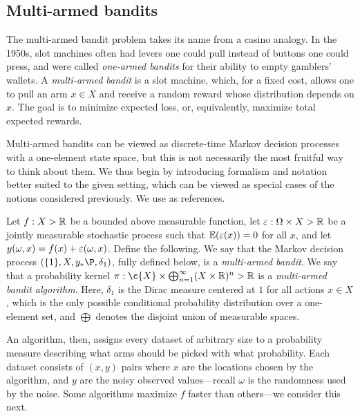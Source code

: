 \documentclass[11pt]{book}
\begin{document}
\subsection{Multi-armed bandits}

The multi-armed bandit problem takes its name from a casino analogy.
In the 1950s, slot machines often had levers one could pull instead of buttons one could press, and were called \emph{one-armed bandits} for their ability to empty gamblers' wallets.
A \emph{multi-armed bandit} is a slot machine, which, for a fixed cost, allows one to pull an arm $x \in X$ and receive a random reward whose distribution depends on $x$.
The goal is to minimize  expected loss, or, equivalently, maximize total expected rewards.

Multi-armed bandits can be viewed as discrete-time Markov decision processes with a one-element state space, but this is not necessarily the most fruitful way to think about them.
We thus begin by introducing formalism and notation better suited to the given setting, which can be viewed as special cases of the notions considered previously.
We use \textcite{slivkins19,lattimore20} as references.

\label{ntn:mab}
\begin{definition}
Let $f : X \-> \mathbb{R}$ be a bounded above measurable function, let $\varepsilon : \Omega \times X \-> \mathbb{R}$ be a jointly measurable stochastic process such that $\operatorname{\mathbb{E}}(\varepsilon(x)) = 0$ for all $x$, and let $y(\omega,x) = f(x) + \varepsilon(\omega,x)$.
Define the following.
\1 We say that the Markov decision process $(\{1\},X,y_*\P,\delta_{1})$, fully defined below, is a \emph{multi-armed bandit}.
\2 We say that a probability kernel  $\pi : \c{X} \x \bigoplus_{n=1}^\infty (X \x \R)^n \-> \R$ is a \emph{multi-armed bandit algorithm}.
\0
Here, $\delta_1$ is the Dirac measure centered at $1$ for all actions $x\in X$, which is the only possible conditional probability distribution over a one-element set, and $\bigoplus$ denotes the disjoint union of measurable spaces.
\end{definition}

An algorithm, then, assigns every dataset of arbitrary size to a probability measure describing what arms should be picked with what probability.
Each dataset consists of $(x, y)$ pairs where $x$ are the locations chosen by the algorithm, and $y$ are the noisy observed values---recall $\omega$ is the randomness used by the noise.
Some algorithms maximize $f$ faster than others---we consider this next.
\end{document}
